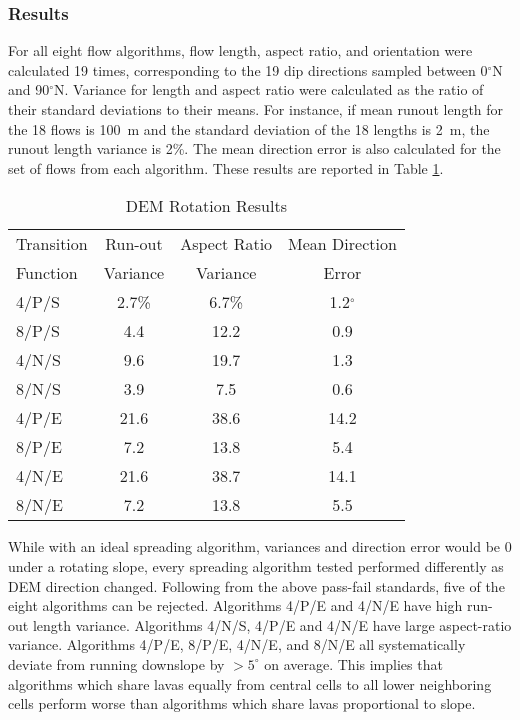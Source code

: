 		
		
		\subsubsection{Results}

		For all eight flow algorithms, flow length, aspect ratio, and orientation were calculated 19 times, corresponding to the 19 dip directions sampled between 0$^{\circ}$N and 90$^{\circ}$N. Variance for length and aspect ratio were calculated as the ratio of their standard deviations to their means. For instance, if mean runout length for the 18 flows is 100~m and the standard deviation of the 18 lengths is 2~m, the runout length variance is 2\%. The mean direction error is also calculated for the set of flows from each algorithm. These results are reported in Table \ref{tab_rotresults}.

			\begin{table}[h]
				\centering
				\caption{DEM Rotation Results}
				\begin{tabular}{l c c c}
					\toprule
					Transition&Run-out&Aspect Ratio&Mean Direction\\
					Function&Variance&Variance&Error\\
					\midrule
					4/P/S &2.7\%&6.7\%&1.2$^{\circ}$\\
					8/P/S &4.4&12.2&0.9\\
					4/N/S &9.6&19.7&1.3\\
					8/N/S &3.9&7.5&0.6\\
					4/P/E &21.6&38.6&14.2\\
					8/P/E &7.2&13.8&5.4\\
					4/N/E &21.6&38.7&14.1\\
					8/N/E &7.2&13.8&5.5\\
					\bottomrule
				\end{tabular}
				\label{tab_rotresults}
			\end{table}

			While with an ideal spreading algorithm, variances and direction error would be 0 under a rotating slope, every spreading algorithm tested performed differently as DEM direction changed. Following from the above pass-fail standards, five of the eight algorithms can be rejected. Algorithms 4/P/E and 4/N/E have high run-out length variance. Algorithms 4/N/S, 4/P/E and 4/N/E have large aspect-ratio variance. Algorithms 4/P/E, 8/P/E, 4/N/E, and 8/N/E all systematically deviate from running downslope by $>5^{\circ}$ on average. This implies that algorithms which share lavas equally from central cells to all lower neighboring cells perform worse than algorithms which share lavas proportional to slope.
			
